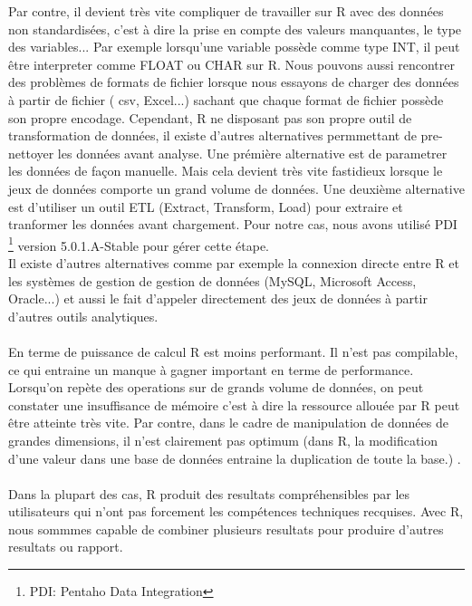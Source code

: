 \documentclass[11pt,a4paper]{report}
\begin{document}
Par contre, il devient très vite compliquer de travailler sur R avec des données non standardisées, c'est à dire la prise en compte des valeurs manquantes, le type des variables... Par exemple lorsqu'une variable possède comme type INT, il peut être interpreter comme FLOAT ou CHAR  sur R. Nous pouvons aussi rencontrer des problèmes de formats de fichier lorsque nous essayons de charger des données à partir de fichier ( csv, Excel...) sachant que chaque format de fichier possède son propre encodage. Cependant, R ne disposant pas son propre outil de transformation de données, il existe d'autres alternatives permmettant de pre-nettoyer les données avant analyse. Une prémière alternative est de parametrer les données de façon manuelle. Mais cela devient très vite fastidieux lorsque le jeux de données comporte un grand volume de données. Une deuxième alternative est d'utiliser un outil ETL (Extract, Transform, Load) pour extraire et tranformer les données avant chargement. Pour notre cas, nous avons utilisé PDI \footnote{PDI: Pentaho Data Integration} version 5.0.1.A-Stable pour gérer cette étape.\\
Il existe d'autres alternatives comme par exemple la connexion directe entre R et les systèmes de gestion de gestion de données (MySQL, Microsoft Access, Oracle...) et aussi le fait d'appeler directement des jeux de données à partir d'autres outils analytiques.\\\\
En terme de puissance de calcul R est moins performant. Il n'est pas compilable, ce qui entraine un manque à gagner important en terme de performance.
 Lorsqu'on repète des operations sur de grands volume de données, on peut constater une insuffisance de mémoire c'est à dire la ressource allouée par R peut être atteinte très vite. Par contre, dans le cadre de manipulation de données de grandes dimensions, il n'est clairement pas optimum (dans R, la modification d'une valeur dans une base de données entraine la duplication de toute la base.) \cite{next_step}.\\\\
 Dans la plupart des cas, R produit des resultats compréhensibles par les utilisateurs qui n'ont pas forcement les compétences techniques recquises. Avec R, nous sommmes capable de combiner plusieurs resultats pour produire d'autres resultats ou rapport. 
\end{document}
